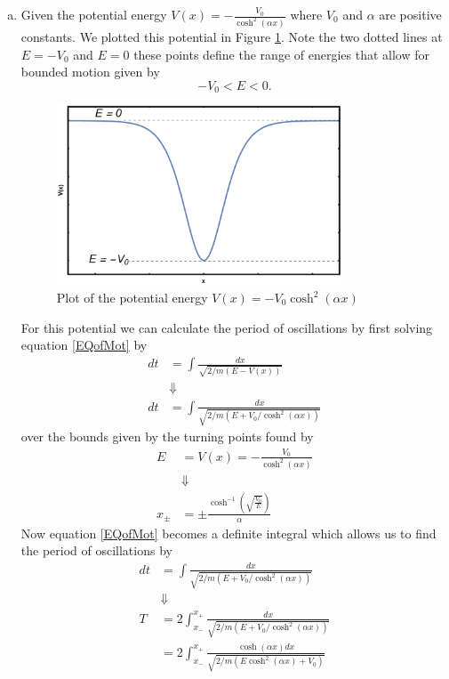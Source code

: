 \documentclass[11pt]{article}
\numberwithin{equation}{section}
\begin{document}
\begin{enumerate}[(a)]
\item Given the potential energy $V(x) = -\frac{V_0}{\cosh^2(\alpha x)}$ where $V_0$ and 
$\alpha$ are positive constants. We plotted this potential in Figure \ref{Prob2b}. Note 
the two dotted lines at $E=-V_0$ and $E=0$ these points define the range of energies that
allow for bounded motion given by
$$-V_0<E<0.$$
\begin{figure}
\centering
\includegraphics[width=0.8\textwidth,keepaspectratio]{Images/Problem2b.png}
\caption{Plot of the potential energy $V(x) = -V_0\cosh^2(\alpha x)$}
\label{Prob2b}
\end{figure}
For this potential we can calculate the period of oscillations by first solving equation 
\ref{EQofMot} by
\begin{align*}
dt &= \int\frac{dx}{\sqrt{2/m(E-V(x))}}\\
&\Downarrow\\
dt &= \int\frac{dx}{\sqrt{2/m(E+V_0/\cosh^2(\alpha x))}}
\end{align*}
over the bounds given by the turning points found by
\begin{align*}
E &= V(x) = -\frac{V_0}{\cosh^2(\alpha x)}\\
&\Downarrow\\
x_{\pm} &= \pm\frac{\cosh^{-1}\left(\sqrt{\frac{V_0}{E}}\right)}{\alpha}
\end{align*}
Now equation \ref{EQofMot} becomes a definite integral which allows us to find the period of
oscillations by
\begin{align*}
dt &= \int\frac{dx}{\sqrt{2/m(E+V_0/\cosh^2(\alpha x))}}\\
&\Downarrow\\
T &= 2\int_{x_-}^{x_+}\frac{dx}{\sqrt{2/m(E+V_0/\cosh^2(\alpha x))}}\\
&= 2\int_{x_-}^{x_+}\frac{\cosh(\alpha x)dx}{\sqrt{2/m(E\cosh^2(\alpha x)+V_0)}}
\end{align*}

\end{enumerate}
\end{document}
